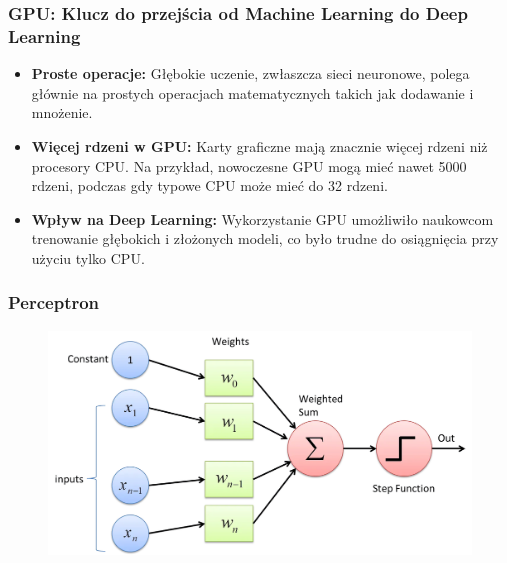 \documentclass[smaller]{beamer}
\begin{document}

\begin{frame}
\frametitle{GPU: Klucz do przejścia od Machine Learning do Deep Learning}

\begin{itemize}
    \item \textbf{Proste operacje:} Głębokie uczenie, zwłaszcza sieci neuronowe, polega głównie na prostych operacjach matematycznych takich jak dodawanie i mnożenie.
    \item \textbf{Więcej rdzeni w GPU:} Karty graficzne mają znacznie więcej rdzeni niż procesory CPU. Na przykład, nowoczesne GPU mogą mieć nawet 5000 rdzeni, podczas gdy typowe CPU może mieć do 32 rdzeni.
    \item \textbf{Wpływ na Deep Learning:} Wykorzystanie GPU umożliwiło naukowcom trenowanie głębokich i złożonych modeli, co było trudne do osiągnięcia przy użyciu tylko CPU.
\end{itemize}

\end{frame}


\begin{frame}
\frametitle{Perceptron}
    \begin{figure}
        \centering
        \includegraphics[width=\textwidth,height=\textheight,keepaspectratio]{../manifest/perceptron.png}
    \end{figure}
\end{frame}

\end{document}
